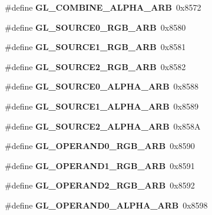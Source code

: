 \begin{DoxyCompactItemize}
\item 
\#define {\bfseries G\+L\+\_\+\+C\+O\+M\+B\+I\+N\+E\+\_\+\+A\+L\+P\+H\+A\+\_\+\+A\+R\+B}~0x8572\label{_s_d_l__opengl_8h_a51cd6921cb69072baae5c5527da2c633}

\item 
\#define {\bfseries G\+L\+\_\+\+S\+O\+U\+R\+C\+E0\+\_\+\+R\+G\+B\+\_\+\+A\+R\+B}~0x8580\label{_s_d_l__opengl_8h_ad6f48350acc935580b15f972fc88058b}

\item 
\#define {\bfseries G\+L\+\_\+\+S\+O\+U\+R\+C\+E1\+\_\+\+R\+G\+B\+\_\+\+A\+R\+B}~0x8581\label{_s_d_l__opengl_8h_a21bcd24f8985d2f2a73acd7b1f5cda7f}

\item 
\#define {\bfseries G\+L\+\_\+\+S\+O\+U\+R\+C\+E2\+\_\+\+R\+G\+B\+\_\+\+A\+R\+B}~0x8582\label{_s_d_l__opengl_8h_a042d2781498f17131e6d5f217c49235c}

\item 
\#define {\bfseries G\+L\+\_\+\+S\+O\+U\+R\+C\+E0\+\_\+\+A\+L\+P\+H\+A\+\_\+\+A\+R\+B}~0x8588\label{_s_d_l__opengl_8h_a5381097cf8761a63fac7e0cd241dc694}

\item 
\#define {\bfseries G\+L\+\_\+\+S\+O\+U\+R\+C\+E1\+\_\+\+A\+L\+P\+H\+A\+\_\+\+A\+R\+B}~0x8589\label{_s_d_l__opengl_8h_a52d110c63decc7cbd5c2c73a2dc3e577}

\item 
\#define {\bfseries G\+L\+\_\+\+S\+O\+U\+R\+C\+E2\+\_\+\+A\+L\+P\+H\+A\+\_\+\+A\+R\+B}~0x858\+A\label{_s_d_l__opengl_8h_a76e177b9f5817fc8afc8ab993c59a58b}

\item 
\#define {\bfseries G\+L\+\_\+\+O\+P\+E\+R\+A\+N\+D0\+\_\+\+R\+G\+B\+\_\+\+A\+R\+B}~0x8590\label{_s_d_l__opengl_8h_a0c6bc7f44854de31ee249e45cc6bb487}

\item 
\#define {\bfseries G\+L\+\_\+\+O\+P\+E\+R\+A\+N\+D1\+\_\+\+R\+G\+B\+\_\+\+A\+R\+B}~0x8591\label{_s_d_l__opengl_8h_a365fa5dfad8bc9050186bad0fbccd3da}

\item 
\#define {\bfseries G\+L\+\_\+\+O\+P\+E\+R\+A\+N\+D2\+\_\+\+R\+G\+B\+\_\+\+A\+R\+B}~0x8592\label{_s_d_l__opengl_8h_adedfa8f970adcbd17a1bf9b317ba247a}

\item 
\#define {\bfseries G\+L\+\_\+\+O\+P\+E\+R\+A\+N\+D0\+\_\+\+A\+L\+P\+H\+A\+\_\+\+A\+R\+B}~0x8598\label{_s_d_l__opengl_8h_a8fe6481c363e98c6187fc5c46c42f8be}


\end{DoxyCompactItemize}
